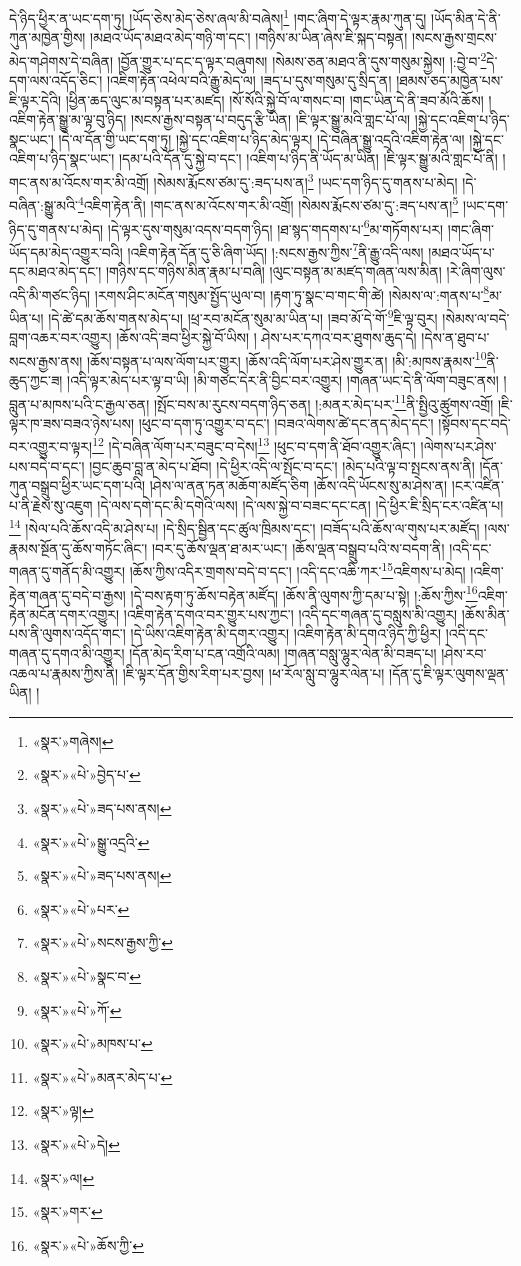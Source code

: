\documentclass[12pt,a4paper]{book}
\begin{document}
དེ་ཉིད་ཕྱིར་ན་ཡང་དག་ཏུ། །ཡོད་ཅེས་མེད་ཅེས་ཞལ་མི་བཞེས།\footnote{«སྣར་»གཞེས།} །གང་ཞིག་དེ་ལྟར་རྣམ་ཀུན་དུ། །ཡོད་མིན་དེ་ནི་ཀུན་མཁྱེན་གྱིས། །མཐའ་ཡོད་མཐའ་མེད་གཉི་ག་དང་། །གཉིས་མ་ཡིན་ཞེས་ཇི་སྐད་བསྟན། །སངས་རྒྱས་གྲངས་མེད་གཤེགས་དེ་བཞིན། །བྱོན་གྱུར་པ་དང་ད་ལྟར་བཞུགས། །སེམས་ཅན་མཐའ་ནི་དུས་གསུམ་སྐྱེས། །:བྱེ་བ་\footnote{«སྣར་»«པེ་»བྱེད་པ་}དེ་དག་ལས་འདོད་ཅིང་། །འཇིག་རྟེན་འཕེལ་བའི་རྒྱུ་མེད་ལ། །ཟད་པ་དུས་གསུམ་དུ་སྲིད་ན། །ཐམས་ཅད་མཁྱེན་པས་ཇི་ལྟར་དེའི། །ཕྱིན་ཆད་ལུང་མ་བསྟན་པར་མཛད། །སོ་སོའི་སྐྱེ་བོ་ལ་གསང་བ། །གང་ཡིན་དེ་ནི་ཟབ་མོའི་ཆོས། །འཇིག་རྟེན་སྒྱུ་མ་ལྟ་བུ་ཉིད། །སངས་རྒྱས་བསྟན་པ་བདུད་རྩི་ཡིན། །ཇི་ལྟར་སྒྱུ་མའི་གླང་པོ་ལ། །སྐྱེ་དང་འཇིག་པ་ཉིད་སྣང་ཡང་། །དེ་ལ་དོན་གྱི་ཡང་དག་ཏུ། །སྐྱེ་དང་འཇིག་པ་ཉིད་མེད་ལྟར། །དེ་བཞིན་སྒྱུ་འདྲའི་འཇིག་རྟེན་ལ། །སྐྱེ་དང་འཇིག་པ་ཉིད་སྣང་ཡང་། །དམ་པའི་དོན་དུ་སྐྱེ་བ་དང་། །འཇིག་པ་ཉིད་ནི་ཡོད་མ་ཡིན། །ཇི་ལྟར་སྒྱུ་མའི་གླང་པོ་ནི། །གང་ནས་མ་འོངས་གར་མི་འགྲོ། །སེམས་རྨོངས་ཙམ་དུ་:ཟད་པས་ན།\footnote{«སྣར་»«པེ་»ཟད་པས་ནས།} །ཡང་དག་ཉིད་དུ་གནས་པ་མེད། །དེ་བཞིན་:སྒྱུ་མའི་\footnote{«སྣར་»«པེ་»སྒྱུ་འདྲའི་}འཇིག་རྟེན་ནི། །གང་ནས་མ་འོངས་གར་མི་འགྲོ། །སེམས་རྨོངས་ཙམ་དུ་:ཟད་པས་ན།\footnote{«སྣར་»«པེ་»ཟད་པས་ནས།} །ཡང་དག་ཉིད་དུ་གནས་པ་མེད། །དེ་ལྟར་དུས་གསུམ་འདས་བདག་ཉིད། །ཐ་སྙད་གདགས་པ་\footnote{«སྣར་»«པེ་»པར་}མ་གཏོགས་པར། །གང་ཞིག་ཡོད་དམ་མེད་འགྱུར་བའི། །འཇིག་རྟེན་དོན་དུ་ཅི་ཞིག་ཡོད། །:སངས་རྒྱས་ཀྱིས་\footnote{«སྣར་»«པེ་»སངས་རྒྱས་ཀྱི་}ནི་རྒྱུ་འདི་ལས། །མཐའ་ཡོད་པ་དང་མཐའ་མེད་དང་། །གཉིས་དང་གཉིས་མིན་རྣམ་པ་བཞི། །ལུང་བསྟན་མ་མཛད་གཞན་ལས་མིན། །རེ་ཞིག་ལུས་འདི་མི་གཙང་ཉིད། །རགས་ཤིང་མངོན་གསུམ་སྤྱོད་ཡུལ་བ། །རྟག་ཏུ་སྣང་བ་གང་གི་ཚེ། །སེམས་ལ་:གནས་པ་\footnote{«སྣར་»«པེ་»སྣང་བ་}མ་ཡིན་པ། །དེ་ཚེ་དམ་ཆོས་གནས་མེད་པ། །ཕྲ་རབ་མངོན་སུམ་མ་ཡིན་པ། །ཟབ་མོ་དེ་གོ་\footnote{«སྣར་»«པེ་»ཀོ་}ཇི་ལྟ་བུར། །སེམས་ལ་བདེ་བླག་འཆར་བར་འགྱུར། །ཆོས་འདི་ཟབ་ཕྱིར་སྐྱེ་བོ་ཡིས། །
ཤེས་པར་དཀའ་བར་ཐུགས་ཆུད་དེ། །དེས་ན་ཐུབ་པ་སངས་རྒྱས་ནས། །ཆོས་བསྟན་པ་ལས་ལོག་པར་གྱུར། །ཆོས་འདི་ལོག་པར་ཤེས་གྱུར་ན། །མི་:མཁས་རྣམས་\footnote{«སྣར་»«པེ་»མཁས་པ་}ནི་ཆུད་ཀྱང་ཟ། །འདི་ལྟར་མེད་པར་ལྟ་བ་ཡི། །མི་གཙང་དེར་ནི་བྱིང་བར་འགྱུར། །གཞན་ཡང་དེ་ནི་ལོག་བཟུང་ནས། །བླུན་པ་མཁས་པའི་ང་རྒྱལ་ཅན། །སྤོང་བས་མ་རུངས་བདག་ཉིད་ཅན། །:མནར་མེད་པར་\footnote{«སྣར་»«པེ་»མནར་མེད་པ་}ནི་སྤྱིའུ་ཚུགས་འགྲོ། །ཇི་ལྟར་ཁ་ཟས་བཟའ་ཉེས་པས། །ཕུང་བ་དག་ཏུ་འགྱུར་བ་དང་། །བཟའ་ལེགས་ཚེ་དང་ནད་མེད་དང་། །སྟོབས་དང་བདེ་བར་འགྱུར་བ་ལྟར།\footnote{«སྣར་»ལྟ།} །དེ་བཞིན་ལོག་པར་བཟུང་བ་དེས།\footnote{«སྣར་»«པེ་»དེ།} །ཕུང་བ་དག་ནི་ཐོབ་འགྱུར་ཞིང་། །ལེགས་པར་ཤེས་པས་བདེ་བ་དང་། །བྱང་ཆུབ་བླ་ན་མེད་པ་ཐོབ། །དེ་ཕྱིར་འདི་ལ་སྤོང་བ་དང་། །མེད་པའི་ལྟ་བ་སྤངས་ནས་ནི། །དོན་ཀུན་བསྒྲུབ་ཕྱིར་ཡང་དག་པའི། །ཤེས་ལ་ནན་ཏན་མཆོག་མཛོད་ཅིག །ཆོས་འདི་ཡོངས་སུ་མ་ཤེས་ན། །ངར་འཛིན་པ་ནི་རྗེས་སུ་འཇུག །དེ་ལས་དགེ་དང་མི་དགེའི་ལས། །དེ་ལས་སྐྱེ་བ་བཟང་དང་ངན། །དེ་ཕྱིར་ཇི་སྲིད་ངར་འཛིན་པ།\footnote{«སྣར་»ལ།} །སེལ་པའི་ཆོས་འདི་མ་ཤེས་པ། །དེ་སྲིད་སྦྱིན་དང་ཚུལ་ཁྲིམས་དང་། །བཟོད་པའི་ཆོས་ལ་གུས་པར་མཛོད། །ལས་རྣམས་སྔོན་དུ་ཆོས་གཏོང་ཞིང་། །བར་དུ་ཆོས་ལྡན་ཐ་མར་ཡང་། །ཆོས་ལྡན་བསྒྲུབ་པའི་ས་བདག་ནི། །འདི་དང་གཞན་དུ་གནོད་མི་འགྱུར། །ཆོས་ཀྱིས་འདིར་གྲགས་བདེ་བ་དང་། །འདི་དང་འཆི་ཀར་\footnote{«སྣར་»གར་}འཇིགས་པ་མེད། །འཇིག་རྟེན་གཞན་དུ་བདེ་བ་རྒྱས། །དེ་བས་རྟག་ཏུ་ཆོས་བརྟེན་མཛོད། །ཆོས་ནི་ལུགས་ཀྱི་དམ་པ་སྟེ། །:ཆོས་ཀྱིས་\footnote{«སྣར་»«པེ་»ཆོས་ཀྱི་}འཇིག་རྟེན་མངོན་དགར་འགྱུར། །འཇིག་རྟེན་དགའ་བར་གྱུར་པས་ཀྱང་། །འདི་དང་གཞན་དུ་བསླུས་མི་འགྱུར། །ཆོས་མིན་པས་ནི་ལུགས་འདོད་གང་། །དེ་ཡིས་འཇིག་རྟེན་མི་དགར་འགྱུར། །འཇིག་རྟེན་མི་དགའ་ཉིད་ཀྱི་ཕྱིར། །འདི་དང་གཞན་དུ་དགའ་མི་འགྱུར། །དོན་མེད་རིག་པ་ངན་འགྲོའི་ལམ། །གཞན་བསླུ་ལྷུར་ལེན་མི་བཟད་པ། །ཤེས་རབ་འཆལ་པ་རྣམས་ཀྱིས་ནི། །ཇི་ལྟར་དོན་གྱིས་རིག་པར་བྱས། །ཕ་རོལ་སླུ་བ་ལྷུར་ལེན་པ། །དོན་དུ་ཇི་ལྟར་ལུགས་ལྡན་ཡིན། །
\end{document}
